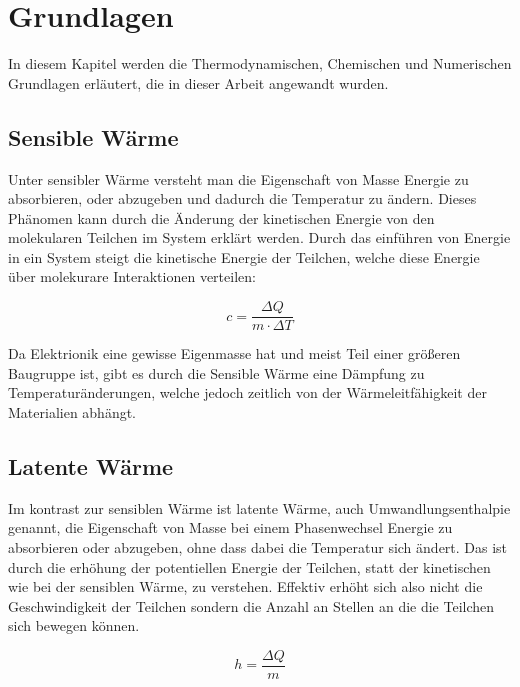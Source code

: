  \chapter{Grundlagen}
\label{chap:Grundlagen}			%

In diesem Kapitel werden die Thermodynamischen, Chemischen und Numerischen Grundlagen erläutert, die in dieser Arbeit angewandt wurden. 

\section{Sensible Wärme}\label{sec:sensiblewaerme}

Unter sensibler Wärme versteht man die Eigenschaft von Masse Energie zu absorbieren, oder abzugeben und dadurch die Temperatur zu ändern. Dieses
Phänomen kann durch die Änderung der kinetischen Energie von den molekularen Teilchen im System erklärt werden. Durch das einführen von Energie in
ein System steigt die kinetische Energie der Teilchen, welche diese Energie über molekurare Interaktionen verteilen:

\begin{equation}
    c = \frac{\Delta Q}{m \cdot \Delta T}
\end{equation}

Da Elektrionik eine gewisse Eigenmasse hat und meist Teil einer größeren Baugruppe ist, gibt es durch die Sensible Wärme eine Dämpfung
zu Temperaturänderungen, welche jedoch zeitlich von der Wärmeleitfähigkeit der Materialien abhängt.

\section{Latente Wärme}\label{sec:latentewaerme}

Im kontrast zur sensiblen Wärme ist latente Wärme, auch Umwandlungsenthalpie genannt, die Eigenschaft von Masse bei einem Phasenwechsel Energie
zu absorbieren oder abzugeben, ohne dass dabei die Temperatur sich ändert. Das ist durch die erhöhung der potentiellen Energie der Teilchen,
statt der kinetischen wie bei der sensiblen Wärme, zu verstehen. Effektiv erhöht sich also nicht die Geschwindigkeit der Teilchen sondern die
Anzahl an Stellen an die die Teilchen sich bewegen können.

\begin{equation}
    h = \frac{\Delta Q}{m}
\end{equation}

